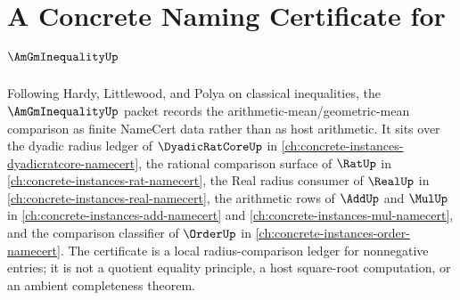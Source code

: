 \chapter{A Concrete Naming Certificate for $\AmGmInequalityUp$}
\label{ch:concrete-instances-am-gm-inequality-namecert}

Following Hardy, Littlewood, and Polya on classical inequalities, the $\AmGmInequalityUp$ packet records the arithmetic-mean/geometric-mean comparison as finite NameCert data rather than as host arithmetic. It sits over the dyadic radius ledger of $\DyadicRatCoreUp$ in \autoref{ch:concrete-instances-dyadicratcore-namecert}, the rational comparison surface of $\RatUp$ in \autoref{ch:concrete-instances-rat-namecert}, the Real radius consumer of $\RealUp$ in \autoref{ch:concrete-instances-real-namecert}, the arithmetic rows of $\AddUp$ and $\MulUp$ in \autoref{ch:concrete-instances-add-namecert} and \autoref{ch:concrete-instances-mul-namecert}, and the comparison classifier of $\OrderUp$ in \autoref{ch:concrete-instances-order-namecert}. The certificate is a local radius-comparison ledger for nonnegative entries; it is not a quotient equality principle, a host square-root computation, or an ambient completeness theorem.

